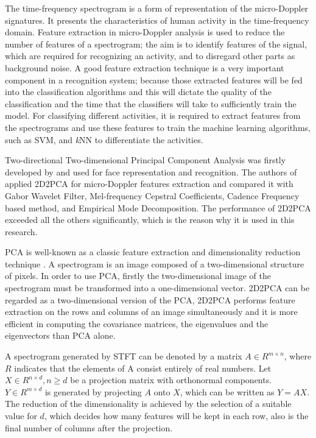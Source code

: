 The time-frequency spectrogram is a form of representation of the micro-Doppler signatures. It presents the characteristics of human activity in the time-frequency domain. Feature extraction in micro-Doppler analysis is used to reduce the number of features of a spectrogram; the aim is to identify features of the signal, which are required for recognizing an activity, and to disregard other parts as background noise. A good feature extraction technique is a very important component in a recognition system; because those extracted features will be fed into the classification algorithms and this will dictate the quality of the classification and the time that the classifiers will take to sufficiently train the model. For classifying different activities, it is required to extract features from the spectrograms and use these features to train the machine learning algorithms, such as SVM, and \textit{k}NN to differentiate the activities.

Two-directional Two-dimensional Principal Component Analysis was firstly developed by \cite{zhang20052d} and used for face representation and recognition. The authors of \cite{tivive2013image} applied 2D2PCA for micro-Doppler features extraction and compared it with Gabor Wavelet Filter, Mel-frequency Cepstral Coefficients, Cadence Frequency based method, and Empirical Mode Decomposition. The performance of 2D2PCA exceeded all the others significantly, which is the reason why it is used in this research.

PCA is well-known as a classic feature extraction and dimensionality reduction technique \cite{wold1987principal}. A spectrogram is an image composed of a two-dimensional structure of pixels. In order to use PCA, firstly the two-dimensional image of the spectrogram must be transformed into a one-dimensional vector. 2D2PCA can be regarded as a two-dimensional version of the PCA, 2D2PCA performs feature extraction on the rows and columns of an image simultaneously and it is more efficient in computing the covariance matrices, the eigenvalues and the eigenvectors than PCA alone.

A spectrogram generated by STFT can be denoted by a matrix $A\in R^{m \times n}$, where $R$ indicates  that the elements of A consist entirely of real numbers. Let  $X\in R^{n\times d},n \geq d$ be a projection matrix with orthonormal components. $Y\in R^{m\times d}$ is generated by projecting $A$ onto $X$, which can be written as $Y=AX$. The reduction of the dimensionality is achieved by the selection of a suitable value for $d$, which decides how many features will be kept in each row, also is the final number of columns after the projection.   

